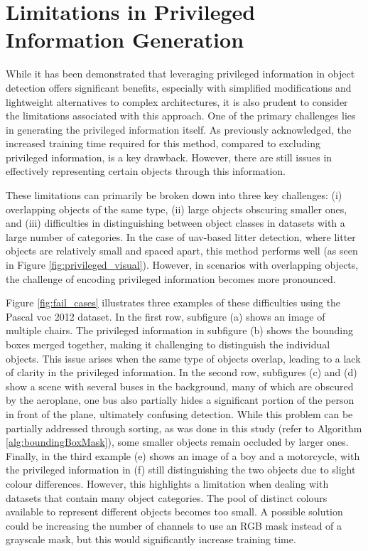 \section{Limitations in Privileged Information Generation}
\label{sec:5_fail_cases_priv_info_gen}

While it has been demonstrated that leveraging privileged information in object detection offers significant benefits, especially with simplified modifications and lightweight alternatives to complex architectures, it is also prudent to consider the limitations associated with this approach. One of the primary challenges lies in generating the privileged information itself. As previously acknowledged, the increased training time required for this method, compared to excluding privileged information, is a key drawback. However, there are still issues in effectively representing certain objects through this information.

These limitations can primarily be broken down into three key challenges: (i) overlapping objects of the same type, (ii) large objects obscuring smaller ones, and (iii) difficulties in distinguishing between object classes in datasets with a large number of categories. In the case of \gls{uav}-based litter detection, where litter objects are relatively small and spaced apart, this method performs well (as seen in Figure \ref{fig:privileged_visual}). However, in scenarios with overlapping objects, the challenge of encoding privileged information becomes more pronounced.

Figure \ref{fig:fail_cases} illustrates three examples of these difficulties using the Pascal \gls{voc} 2012 dataset. In the first row, subfigure (a) shows an image of multiple chairs. The privileged information in subfigure (b) shows the bounding boxes merged together, making it challenging to distinguish the individual objects. This issue arises when the same type of objects overlap, leading to a lack of clarity in the privileged information. In the second row, subfigures (c) and (d) show a scene with several buses in the background, many of which are obscured by the aeroplane, one bus also partially hides a significant portion of the person in front of the plane, ultimately confusing detection. While this problem can be partially addressed through sorting, as was done in this study (refer to Algorithm \ref{alg:boundingBoxMask}), some smaller objects remain occluded by larger ones. Finally, in the third example (e) shows an image of a boy and a motorcycle, with the privileged information in (f) still distinguishing the two objects due to slight colour differences. However, this highlights a limitation when dealing with datasets that contain many object categories. The pool of distinct colours available to represent different objects becomes too small. A possible solution could be increasing the number of channels to use an RGB mask instead of a grayscale mask, but this would significantly increase training time.

